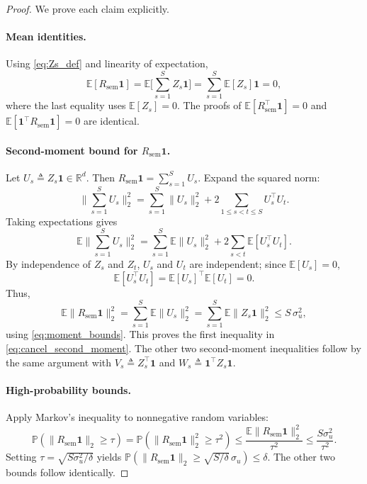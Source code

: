 \begin{proof}
We prove each claim explicitly.

\paragraph{Mean identities.}
Using \eqref{eq:Zs_def} and linearity of expectation,
\[
\mathbb{E}[R_{\mathrm{sem}}\mathbf{1}]
=
\mathbb{E}\Big[\sum_{s=1}^S Z_s\mathbf{1}\Big]
=
\sum_{s=1}^S \mathbb{E}[Z_s]\mathbf{1}
=
0,
\]
where the last equality uses $\mathbb{E}[Z_s]=0$.
The proofs of $\mathbb{E}[R_{\mathrm{sem}}^\top\mathbf{1}]=0$ and
$\mathbb{E}[\mathbf{1}^\top R_{\mathrm{sem}}\mathbf{1}]=0$ are identical.

\paragraph{Second-moment bound for $R_{\mathrm{sem}}\mathbf{1}$.}
Let $U_s \triangleq Z_s\mathbf{1}\in\mathbb{R}^d$. Then $R_{\mathrm{sem}}\mathbf{1}=\sum_{s=1}^S U_s$.
Expand the squared norm:
\[
\Big\|\sum_{s=1}^S U_s\Big\|_2^2
=
\sum_{s=1}^S \|U_s\|_2^2
+
2\sum_{1\le s<t\le S} U_s^\top U_t.
\]
Taking expectations gives
\[
\mathbb{E}\Big\|\sum_{s=1}^S U_s\Big\|_2^2
=
\sum_{s=1}^S \mathbb{E}\|U_s\|_2^2
+
2\sum_{s<t} \mathbb{E}[U_s^\top U_t].
\]
By independence of $Z_s$ and $Z_t$, $U_s$ and $U_t$ are independent; since $\mathbb{E}[U_s]=0$,
\[
\mathbb{E}[U_s^\top U_t]
=
\mathbb{E}[U_s]^\top \mathbb{E}[U_t]
=
0.
\]
Thus,
\[
\mathbb{E}\|R_{\mathrm{sem}}\mathbf{1}\|_2^2
=
\sum_{s=1}^S \mathbb{E}\|U_s\|_2^2
=
\sum_{s=1}^S \mathbb{E}\|Z_s\mathbf{1}\|_2^2
\le
S\,\sigma_u^2,
\]
using \eqref{eq:moment_bounds}. This proves the first inequality in \eqref{eq:cancel_second_moment}.
The other two second-moment inequalities follow by the same argument with
$V_s \triangleq Z_s^\top\mathbf{1}$ and $W_s \triangleq \mathbf{1}^\top Z_s\mathbf{1}$.

\paragraph{High-probability bounds.}
Apply Markov's inequality to nonnegative random variables:
\[
\mathbb{P}\!\left(\|R_{\mathrm{sem}}\mathbf{1}\|_2 \ge \tau\right)
=
\mathbb{P}\!\left(\|R_{\mathrm{sem}}\mathbf{1}\|_2^2 \ge \tau^2\right)
\le
\frac{\mathbb{E}\|R_{\mathrm{sem}}\mathbf{1}\|_2^2}{\tau^2}
\le
\frac{S\sigma_u^2}{\tau^2}.
\]
Setting $\tau=\sqrt{S\sigma_u^2/\delta}$ yields
$\mathbb{P}(\|R_{\mathrm{sem}}\mathbf{1}\|_2 \ge \sqrt{S/\delta}\,\sigma_u)\le\delta$.
The other two bounds follow identically.
\end{proof}

